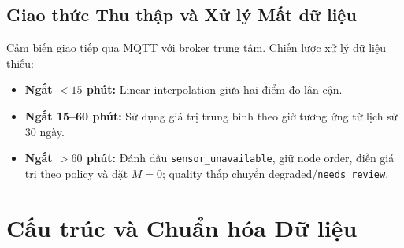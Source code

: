 \subsection{Giao thức Thu thập và Xử lý Mất dữ liệu}
Cảm biến giao tiếp qua MQTT với broker trung tâm. Chiến lược xử lý dữ liệu thiếu:
\begin{itemize}[leftmargin=1.5cm, itemsep=3pt]
  \item \textbf{Ngắt $< 15$ phút:} Linear interpolation giữa hai điểm đo lân cận.
  \item \textbf{Ngắt 15--60 phút:} Sử dụng giá trị trung bình theo giờ tương ứng từ lịch sử 30 ngày.
  \item \textbf{Ngắt $> 60$ phút:} Đánh dấu \texttt{sensor\_unavailable}, giữ node order, điền giá trị theo policy và đặt $M=0$; quality thấp chuyển degraded/\texttt{needs\_review}.
\end{itemize}
\section{Cấu trúc và Chuẩn hóa Dữ liệu}
